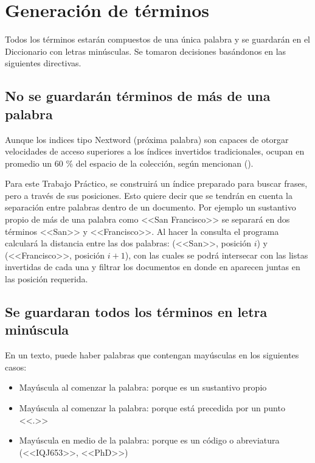 
\section{Generación de términos}\label{sec:parser}
 
Todos los términos estarán compuestos de una única palabra y se guardarán en el Diccionario con letras minúsculas. Se tomaron decisiones basándonos en las siguientes directivas.


\subsection{No se guardarán términos de más de una palabra}

Aunque los indices tipo Nextword (próxima palabra) son capaces de otorgar velocidades de acceso superiores a los índices invertidos tradicionales, ocupan en promedio un 60 \% del espacio de la colección, según mencionan \citet{Williams99what'snext?} (\citeyear{Williams99what'snext?}). 

Para este Trabajo Práctico, se construirá un índice preparado para buscar frases, pero a través de sus posiciones. Esto quiere decir que se tendrán en cuenta la separación entre palabras dentro de un documento. Por ejemplo un sustantivo propio de más de una palabra como <<San Francisco>> se separará en dos términos <<San>> y <<Francisco>>. Al hacer la consulta el programa calculará la distancia entre las dos palabras: (<<San>>, posición $i$) y (<<Francisco>>, posición $i+1$), con las cuales se podrá intersecar con las listas invertidas de cada una y filtrar los documentos en donde en aparecen juntas en las posición requerida.


\subsection{Se guardaran todos los términos en letra minúscula}
En un texto, puede haber palabras que contengan mayúsculas en los siguientes casos:


\begin{itemize}
\item Mayúscula al comenzar la palabra: porque es un sustantivo propio
\item Mayúscula al comenzar la palabra: porque está precedida por un punto <<.>>
\item Mayúscula en medio de la palabra: porque es un código o abreviatura (<<IQJ653>>, <<PhD>>)
\end{itemize}

